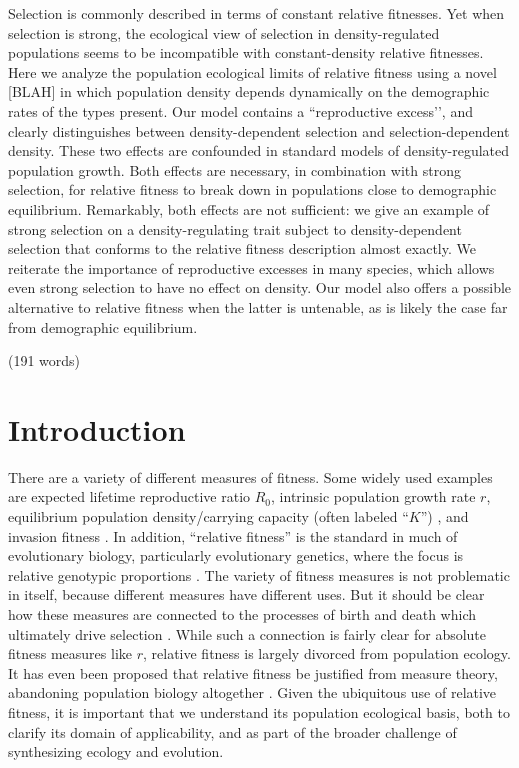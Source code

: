 \documentclass[12pt]{article}
\begin{document}
Selection is commonly described in terms of constant relative fitnesses. Yet when selection is strong, the ecological view of selection in density-regulated populations seems to be incompatible with constant-density relative fitnesses. Here we analyze the population ecological limits of relative fitness using a novel [BLAH] in which population density depends dynamically on the demographic rates of the types present. Our model contains a ``reproductive excess’’, and clearly distinguishes between density-dependent selection and selection-dependent density. These two effects are confounded in standard models of density-regulated population growth. Both effects are necessary, in combination with strong selection, for relative fitness to break down in populations close to demographic equilibrium. Remarkably, both effects are not sufficient: we give an example of strong selection on a density-regulating trait subject to density-dependent selection that conforms to the relative fitness description almost exactly. We reiterate the importance of reproductive excesses in many species, which allows even strong selection to have no effect on density. Our model also offers a possible alternative to relative fitness when the latter is untenable, as is likely the case far from demographic equilibrium. 

\noindent (191 words)



\newpage{}


\section*{Introduction}

There are a variety of different measures of fitness. Some widely used examples are expected lifetime reproductive ratio $R_0$, intrinsic population growth rate $r$, equilibrium population density/carrying capacity (often labeled ``$K$'') \citep{benton_2000}, and invasion fitness \citep{metz_1992}. In addition, ``relative fitness'' is the standard in much of evolutionary biology, particularly evolutionary genetics, where the focus is relative genotypic proportions \cite[pp. 468]{barton_2007}. The variety of fitness measures is not problematic in itself, because different measures have different uses. But it should be clear how these measures are connected to the processes of birth and death which ultimately drive selection \citep{metcalf_2007,doebeli_2017}. While such a connection is fairly clear for absolute fitness measures like $r$, relative fitness is largely divorced from population ecology. It has even been proposed that relative fitness be justified from measure theory, abandoning population biology altogether \citep{wagner_2010}. Given the ubiquitous use of relative fitness, it is important that we understand its population ecological basis, both to clarify its domain of applicability, and as part of the broader challenge of synthesizing ecology and evolution.
\end{document}
